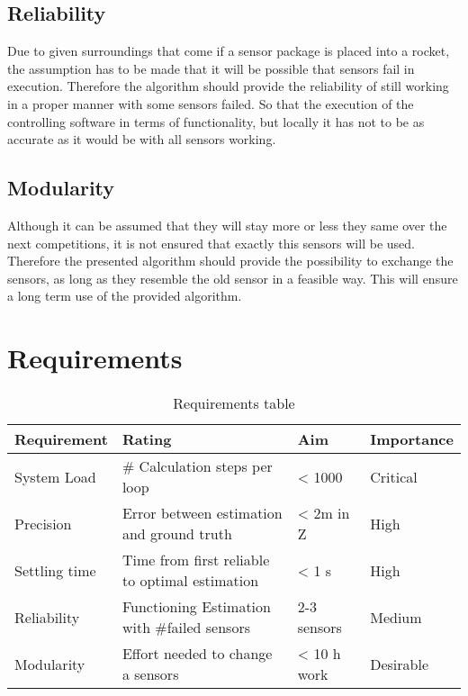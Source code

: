  \subsection{Reliability}
 Due to given surroundings that come if a sensor package is placed into a rocket, the assumption has to be made that it will be possible that sensors fail in execution.
 Therefore the algorithm should provide the reliability of still working in a proper manner with some sensors failed. So that the execution of the controlling software
 in terms of functionality, but locally it has not to be as accurate as it would be with all sensors working.

 \subsection{Modularity}
 Although it can be assumed that they will stay more or less they same over the next competitions, it is not ensured that exactly this sensors will be used.
 Therefore the presented algorithm should provide the possibility to exchange the sensors, as long as they resemble the old sensor in a feasible way.
 This will ensure a long term use of the provided algorithm.
 
 
 
 \section{Requirements}
 
 \begin{table}[h]
 \centering
 \begin{tabular}{|l|l|l|l|}	
 \hline	
 \bf{Requirement}   & \bf{Rating} & \bf{Aim} & \bf{Importance} \\ \hline
 System Load   & \# Calculation steps per loop & < 1000 & Critical \\ \hline
 Precision     & Error between estimation and ground truth  & < 2m in Z & High  \\ \hline
 Settling time & Time from first reliable to optimal estimation  & < 1 s &  High \\ \hline
 Reliability   & Functioning Estimation with \#failed sensors & 2-3 sensors & Medium \\ \hline	
 Modularity    & Effort needed to change a sensors & < 10 h work &  Desirable \\ \hline
 \end{tabular}	
 \caption{Requirements table}
 \label{tab:Requirements}
 \end{table}
 
